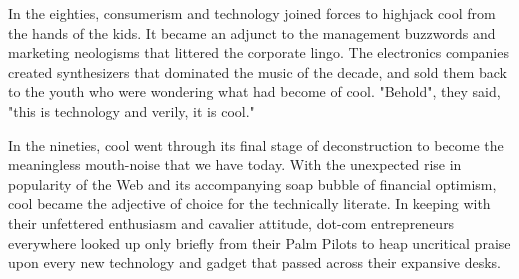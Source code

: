 \documentclass{article}
\begin{document}
In the eighties, consumerism and technology joined forces to highjack
cool from the hands of the kids. It became an adjunct to the management
buzzwords and marketing neologisms that littered the corporate lingo.
The electronics companies created synthesizers that dominated the music
of the decade, and sold them back to the youth who were wondering what
had become of cool. "Behold", they said, "this is technology and verily,
it is cool."

In the nineties, cool went through its final stage of deconstruction to
become the meaningless mouth-noise that we have today. With the
unexpected rise in popularity of the Web and its accompanying soap
bubble of financial optimism, cool became the adjective of choice for
the technically literate. In keeping with their unfettered enthusiasm
and cavalier attitude, dot-com entrepreneurs everywhere looked up only
briefly from their Palm Pilots to heap uncritical praise upon every new
technology and gadget that passed across their expansive desks.
\end{document}
